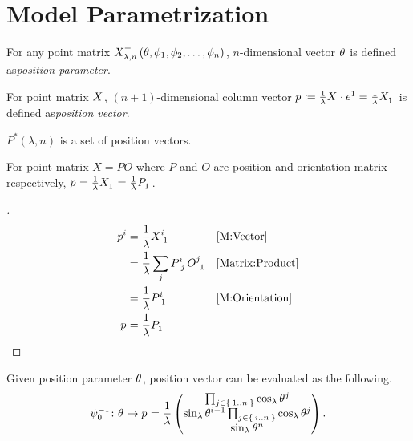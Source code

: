 \documentclass[../main.tex]{subfiles}
\begin{document}
\section{Model Parametrization}
\begin{definition}\label{M:Parameter}
For any point matrix $\tensor{X^\pm_{\lambda,n}\left(\theta,\phi_1,\phi_2,\dots,\phi_n\right)}{}$,
$n$-dimensional vector $\tensor{\theta}{}$
is defined as\textit{position parameter}.
\end{definition}
\begin{definition}\label{M:Vector}
For point matrix $\tensor{X}{}$,
$\left(n+1\right)$-dimensional column vector $\tensor{p}{}\coloneqq\frac{1}{\lambda}\tensor{X}{}\cdot\tensor{e}{^1}=\frac{1}{\lambda}\tensor{X}{_1}$
is defined as\textit{position vector}.
\end{definition}
\begin{definition}\label{M:Vector:Set}
$P^\ast\left(\lambda,n\right)$ is a set of position vectors.
\end{definition}
\begin{lemma}\label{M:Vector:Position}
For point matrix $X=PO$
where $P$ and $O$ are position and orientation matrix respectively,
$\tensor{p}{}=\frac{1}{\lambda}\tensor{X}{_1}=\frac{1}{\lambda}\tensor{P}{_1}$.
\end{lemma}
\begin{proof}[]
\begin{align*}
\tensor{p}{^i}
&=\frac{1}{\lambda}\tensor{X}{^i_1}&&\text{\cref{M:Vector}}\\
&=\frac{1}{\lambda}\sum_j{\tensor{P}{^i_j}\tensor{O}{^j_1}}&&\text{\cref{Matrix:Product}}\\
&=\frac{1}{\lambda}\tensor{P}{^i_1}&&\text{\cref{M:Orientation}}\\
\tensor{p}{}
&=\frac{1}{\lambda}\tensor{P}{_1}&&\qedhere
\end{align*}
\end{proof}
\begin{lemma}\label{M:Vector:Value}
Given position parameter $\tensor{\theta}{}$, position vector can be evaluated as the following.
\begin{equation*}
\psi_0^{-1}\colon\tensor{\theta}{}\mapsto\tensor{p}{}
=\frac{1}{\lambda}
\begin{pmatrix}
\prod_{j\in\Set{1..n}}{\cos_\lambda{\tensor{\theta}{^j}}}\\
\sin_\lambda{\tensor{\theta}{^{i-1}}}\prod_{j\in\Set{i..n}}{\cos_\lambda{\tensor{\theta}{^j}}}\\
\sin_\lambda{{\tensor{\theta}{^n}}}\\
\end{pmatrix}\text{.}
\end{equation*}
\end{lemma}
\end{document}
